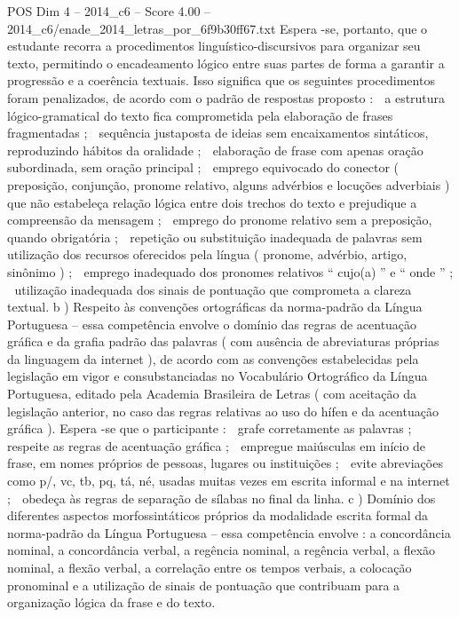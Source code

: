 \begin{textsample}{POS Dim 4 – 2014\_c6 – Score 4.00 – 2014\_c6/enade\_2014\_letras\_por\_6f9b30ff67.txt}
Espera -se, portanto, que o estudante recorra a procedimentos linguístico-discursivos para organizar seu texto, permitindo o encadeamento lógico entre suas partes de forma a garantir a progressão e a coerência textuais.
Isso significa que os seguintes procedimentos foram penalizados, de acordo com o padrão de respostas proposto :  a estrutura lógico-gramatical do texto fica comprometida pela elaboração de frases fragmentadas ;  sequência justaposta de ideias sem encaixamentos sintáticos, reproduzindo hábitos da oralidade ;  elaboração de frase com apenas oração subordinada, sem oração principal ;  emprego equivocado do conector ( preposição, conjunção, pronome relativo, alguns advérbios e locuções adverbiais ) que não estabeleça relação lógica entre dois trechos do texto e prejudique a compreensão da mensagem ;  emprego do pronome relativo sem a preposição, quando obrigatória ;  repetição ou substituição inadequada de palavras sem utilização dos recursos oferecidos pela língua ( pronome, advérbio, artigo, sinônimo ) ;  emprego inadequado dos pronomes relativos “ cujo(a) ” e “ onde ” ;  utilização inadequada dos sinais de pontuação que comprometa a clareza textual. b ) Respeito às convenções ortográficas da norma-padrão da Língua Portuguesa – essa competência envolve o domínio das regras de acentuação gráfica e da grafia padrão das palavras ( com ausência de abreviaturas próprias da linguagem da internet ), de acordo com as convenções estabelecidas pela legislação em vigor e consubstanciadas no Vocabulário Ortográfico da Língua Portuguesa, editado pela Academia Brasileira de Letras ( com aceitação da legislação anterior, no caso das regras relativas ao uso do hífen e da acentuação gráfica ).
Espera -se que o participante :  grafe corretamente as palavras ;  respeite as regras de acentuação gráfica ;  empregue maiúsculas em início de frase, em nomes próprios de pessoas, lugares ou instituições ;  evite abreviações como p/, vc, tb, pq, tá, né, usadas muitas vezes em escrita informal e na internet ;  obedeça às regras de separação de sílabas no final da linha. c ) Domínio dos diferentes aspectos morfossintáticos próprios da modalidade escrita formal da norma-padrão da Língua Portuguesa – essa competência envolve : a concordância nominal, a concordância verbal, a regência nominal, a regência verbal, a flexão nominal, a flexão verbal, a correlação entre os tempos verbais, a colocação pronominal e a utilização de sinais de pontuação que contribuam para a organização lógica da frase e do texto.

\end{textsample}
